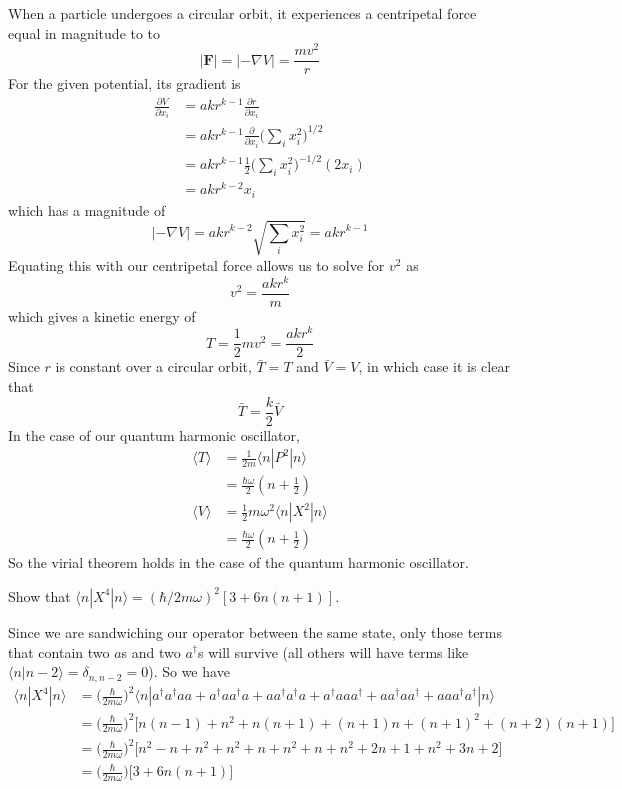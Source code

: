 \documentclass[../principles-of-quantum-mechanics.tex]{subfiles}
\begin{document}
\begin{questions}
		\begin{solution}
			When a particle undergoes a circular orbit, it experiences a centripetal force equal in magnitude to to
			$$|\mathbf{F}| = |{-\nabla V}| = \frac{mv^2}{r}$$
			For the given potential, its gradient is
			\begin{align*}
				\frac{\partial V}{\partial x_i} &= akr^{k-1}\frac{\partial r}{\partial x_i} \\
				&= akr^{k-1}\frac{\partial}{\partial x_i}\Big(\sum_i x_i^2\Big)^{1/2} \\
				&= akr^{k-1}\frac{1}{2}\Big(\sum_i x_i^2\Big)^{-1/2}(2x_i) \\
				&= akr^{k-2}x_i
			\end{align*}
			which has a magnitude of
			$$|{-\nabla V}| = akr^{k-2}\sqrt{\sum_i x_i^2} = akr^{k-1}$$
			Equating this with our centripetal force allows us to solve for $v^2$ as
			$$v^2 = \frac{akr^k}{m}$$
			which gives a kinetic energy of
			$$T = \frac{1}{2}mv^2 = \frac{akr^k}{2}$$
			Since $r$ is constant over a circular orbit, $\bar{T} = T$ and $\bar{V} = V$, in which case it is clear that
			$$\bar{T} = \frac{k}{2}\bar{V}$$
			In the case of our quantum harmonic oscillator,
			\begin{align*}
				\langle T\rangle &= \frac{1}{2m}\langle n|P^2|n\rangle \\
				&= \frac{\hbar\omega}{2}(n + \tfrac{1}{2}) \\
				\langle V\rangle &= \frac{1}{2}m\omega^2\langle n|X^2|n\rangle \\
				&= \frac{\hbar\omega}{2}(n + \tfrac{1}{2})
			\end{align*}
			So the virial theorem holds in the case of the quantum harmonic oscillator.
		\end{solution}
		
		\question Show that $\langle n|X^4|n\rangle = (\hbar/2m\omega)^2[3 + 6n(n+1)]$.
		\begin{solution}
			Since we are sandwiching our operator between the same state, only those terms that contain two $a$s and two $a^\dagger$s will survive (all others will have terms like $\langle n|n-2\rangle = \delta_{n, n-2} = 0$). So we have
			\begin{align*}
				\langle n|X^4|n\rangle &= \Big(\frac{\hbar}{2m\omega}\Big)^2\langle n|a^\dagger a^\dagger a a + a^\dagger a a^\dagger a + aa^\dagger a^\dagger a + a^\dagger a a a^\dagger + a a^\dagger a a^\dagger+ a a a^\dagger a^\dagger|n\rangle \\
				&= \Big(\frac{\hbar}{2m\omega}\Big)^2\Big[n(n-1) + n^2 + n(n+1) + (n+1)n + (n+1)^2 + (n+2)(n+1)\Big] \\
				&= \Big(\frac{\hbar}{2m\omega}\Big)^2\Big[n^2 - n + n^2 + n^2 + n + n^2 + n + n^2 + 2n + 1 + n^2 + 3n + 2\Big] \\
				&= \Big(\frac{\hbar}{2m\omega}\Big)\big[3 + 6n(n + 1)\big]
			\end{align*}
		\end{solution}
		

\end{questions}
\end{document}
